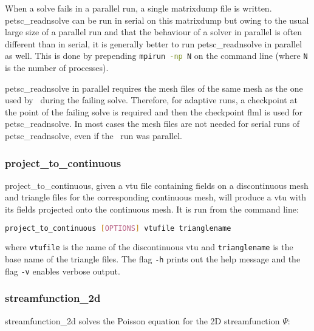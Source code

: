 When a solve fails in a parallel run, a single matrixdump file is written. petsc\_readnsolve can be run in serial on this matrixdump but owing to the usual large size of a parallel run and that the behaviour of a solver in parallel is often different than in serial, it is generally better to run petsc\_readnsolve in parallel as well. This is done by prepending \lstinline[language = Bash]+mpirun -np N+ on the command line (where \lstinline[language = Bash]+N+ is the number of processes).

petsc\_readnsolve in parallel requires the mesh files of the same mesh as the one used by \fluidity\ during the failing solve. Therefore, for adaptive runs, a checkpoint at the point of the failing solve is required and then the checkpoint flml is used for petsc\_readnsolve. In most cases the mesh files are not needed for serial runs of petsc\_readnsolve, even if the \fluidity\ run was parallel.


\subsubsection{project\_to\_continuous}
\label{sect:project_to_continuous}
project\_to\_continuous, given a vtu file containing fields on a discontinuous mesh and triangle files for the corresponding continuous mesh, will produce a vtu with its fields projected onto the continuous mesh. It is run from the command line:

\begin{lstlisting}[language = Bash]
project_to_continuous [OPTIONS] vtufile trianglename
\end{lstlisting}

where \lstinline[language = Bash]+vtufile+ is the name of the discontinuous vtu and \lstinline[language = Bash]+trianglename+ is the base name of the triangle files. The flag \lstinline[language = Bash]+-h+ prints out the help message and the flag \lstinline[language = Bash]+-v+ enables verbose output.


\subsubsection{streamfunction\_2d}
\label{sect:streamfunction_2d}

streamfunction\_2d solves the Poisson equation for the 2D streamfunction $\Psi$:

